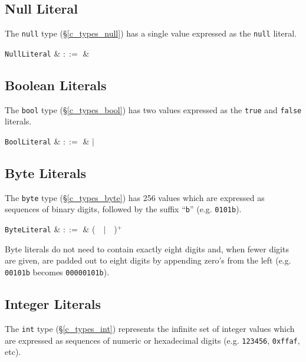 \subsection{Null Literal}

The \lstinline{null} type (\S\ref{c_types_null}) has a single value expressed as the \lstinline{null} literal.

\begin{syntax}
  \verb+NullLiteral+ & $::=$ &  \\
\end{syntax}


\subsection{Boolean Literals}

The \lstinline{bool} type (\S\ref{c_types_bool}) has two values expressed as the \lstinline{true} and \lstinline{false} literals.

\begin{syntax}
  \verb+BoolLiteral+ & $::=$ &  $|$  \\
\end{syntax}


\subsection{Byte Literals}

The \lstinline{byte} type (\S\ref{c_types_byte}) has 256 values which are expressed as sequences of binary digits, followed by the suffix ``\lstinline{b}'' (e.g. \lstinline{0101b}).


\begin{syntax}
 \verb+ByteLiteral+ & $::=$ & \big(\ \ $|$\ \ \big)$^+$\ \\
\end{syntax}


Byte literals do not need to contain exactly eight digits and, when fewer digits are given, are padded out to eight digits by appending zero's from the left (e.g. \lstinline{00101b} becomes \lstinline{00000101b}).


\subsection{Integer Literals}

The \lstinline{int} type (\S\ref{c_types_int}) represents the infinite set of integer values which are expressed as sequences of numeric or hexadecimal digits (e.g. \lstinline{123456}, \lstinline{0xffaf}, etc).

